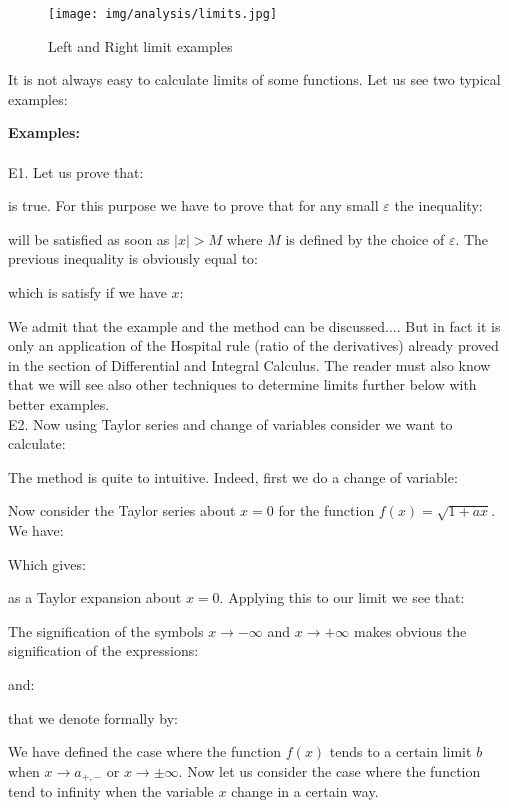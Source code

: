 	\begin{figure}[H]
		\centering
		\texttt{[image: img/analysis/limits.jpg]}
		\caption{Left and Right limit examples}
	\end{figure}
	It is not always easy to calculate limits of some functions. Let us see two typical examples:
	\begin{tcolorbox}[colframe=black,colback=white,sharp corners]
	\textbf{{\Large {}}Examples:}\\\\
	E1. Let us prove that:
		
	is true. For this purpose we have to prove that for any small $\varepsilon$ the inequality:
	
	will be satisfied as soon as $|x|>M$ where $M$ is defined by the choice of $\varepsilon$. The previous inequality is obviously equal to:
	
	which is satisfy if we have $x$:
	
	We admit that the example and the method can be discussed.... But in fact it is only an application of the Hospital rule (ratio of the derivatives) already proved in the section of Differential and Integral Calculus. The reader must also know that we will see also other techniques to determine limits further below with better examples.\\
	
	E2. Now using Taylor series and change of variables consider we want to calculate:
	
	The method is quite to intuitive. Indeed, first we do a change of variable:
	
	Now consider the Taylor series about $x=0$ for the function $f(x)=\sqrt{1+ax}$. We have:
	
	Which gives:
	\end{tcolorbox}
	
	\pagebreak
	\begin{tcolorbox}[colframe=black,colback=white,sharp corners]
	
	as a Taylor expansion about $x=0$. Applying this to our limit we see that:
	
	\end{tcolorbox}
	
	The signification of the symbols $x\rightarrow -\infty$ and $x\rightarrow +\infty$ makes obvious the signification of the expressions:
	
	and:
	
	that we denote formally by:	
	
	We have defined the case where the function $f (x)$ tends to a certain limit $b$ when $x\rightarrow a_{+,-}$ or $x\rightarrow \pm \infty$. Now let us consider the case where the function tend to infinity when the variable $x$ change in a certain way.
	
